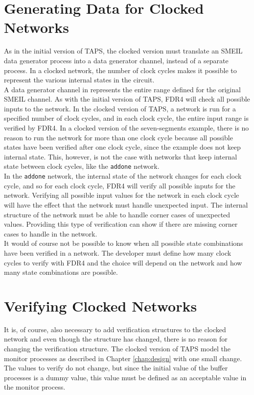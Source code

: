 \section{Generating Data for Clocked Networks}
As in the initial version of TAPS, the clocked version must translate an SMEIL data generator process into a \cspm{} data generator channel, instead of a separate process. In a clocked network, the number of clock cycles makes it possible to represent the various internal states in the circuit.\\

A data generator channel in \cspm{} represents the entire range defined for the original SMEIL channel. As with the initial version of TAPS, FDR4 will check all possible inputs to the network.
In the clocked version of TAPS, a network is run for a specified number of clock cycles, and in each clock cycle, the entire input range is verified by FDR4.
In a clocked version of the seven-segments example, there is no reason to run the network for more than one clock cycle because all possible states have been verified after one clock cycle, since the example does not keep internal state. This, however, is not the case with networks that keep internal state between clock cycles, like the \texttt{addone} network.\\

In the \texttt{addone} network, the internal state of the network changes for each clock cycle, and so for each clock cycle, FDR4 will verify all possible inputs for the network. Verifying all possible input values for the network in each clock cycle will have the effect that the network must handle unexpected input. The internal structure of the network must be able to handle corner cases of unexpected values. Providing this type of verification can show if there are missing corner cases to handle in the network.\\

It would of course not be possible to know when all possible state combinations have been verified in a network. The developer must define how many clock cycles to verify with FDR4 and the choice will depend on the network and how many state combinations are possible.

\section{Verifying Clocked Networks}
It is, of course, also necessary to add verification structures to the clocked \cspm{} network and even though the structure has changed, there is no reason for changing the verification structure. The clocked version of TAPS model the monitor processes as described in Chapter \ref{chap:design} with one small change. The values to verify do not change, but since the initial value of the buffer processes is a dummy value, this value must be defined as an acceptable value in the monitor process. \\

